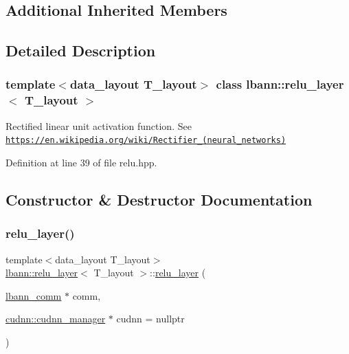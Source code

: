 \subsection*{Additional Inherited Members}


\subsection{Detailed Description}
\subsubsection*{template$<$data\+\_\+layout T\+\_\+layout$>$\newline
class lbann\+::relu\+\_\+layer$<$ T\+\_\+layout $>$}

Rectified linear unit activation function. See \href{https://en.wikipedia.org/wiki/Rectifier_(neural_networks)}{\tt https\+://en.\+wikipedia.\+org/wiki/\+Rectifier\+\_\+(neural\+\_\+networks)} 

Definition at line 39 of file relu.\+hpp.



\subsection{Constructor \& Destructor Documentation}
\mbox{\label{classlbann_1_1relu__layer_af4739658d074a62cd71ce0ca7e791c06}} 
\subsubsection{\texorpdfstring{relu\+\_\+layer()}{relu\_layer()}\hspace{0.1cm}{\footnotesize\ttfamily [1/2]}}
{\footnotesize\ttfamily template$<$data\+\_\+layout T\+\_\+layout$>$ \\
\hyperlink{classlbann_1_1relu__layer}{lbann\+::relu\+\_\+layer}$<$ T\+\_\+layout $>$\+::\hyperlink{classlbann_1_1relu__layer}{relu\+\_\+layer} (\begin{DoxyParamCaption}\item[{\hyperlink{classlbann_1_1lbann__comm}{lbann\+\_\+comm} $\ast$}]{comm,  }\item[{\hyperlink{classlbann_1_1cudnn_1_1cudnn__manager}{cudnn\+::cudnn\+\_\+manager} $\ast$}]{cudnn = {\ttfamily nullptr} }\end{DoxyParamCaption})\hspace{0.3cm}{\ttfamily [inline]}}



